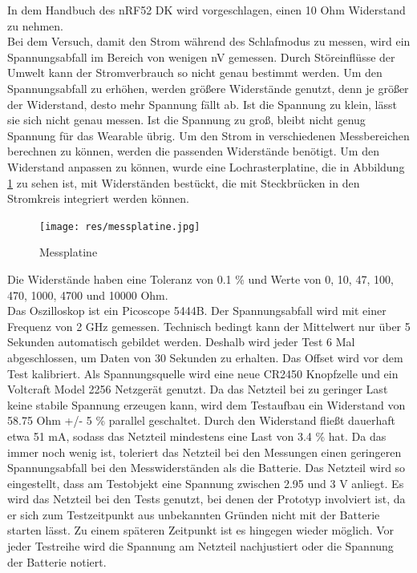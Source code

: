 In dem Handbuch des nRF52 DK wird vorgeschlagen, einen 10 Ohm Widerstand zu nehmen. \cite{site_nrf52dk}\\
Bei dem Versuch, damit den Strom während des Schlafmodus zu messen, wird ein Spannungsabfall im Bereich von wenigen nV gemessen.
Durch Störeinflüsse der Umwelt kann der Stromverbrauch so nicht genau bestimmt werden.
Um den Spannungsabfall zu erhöhen, werden größere Widerstände genutzt, denn je größer der Widerstand, desto mehr Spannung fällt ab.
Ist die Spannung zu klein, lässt sie sich nicht genau messen.
Ist die Spannung zu groß, bleibt nicht genug Spannung für das Wearable übrig.
Um den Strom in verschiedenen Messbereichen berechnen zu können, werden die passenden Widerstände benötigt.
Um den Widerstand anpassen zu können, wurde eine Lochrasterplatine, die in Abbildung \ref{fig:messplatine} zu sehen ist, mit Widerständen bestückt, die mit Steckbrücken in den Stromkreis integriert werden können.
\begin{figure}[hbtp]
	\centering
	\texttt{[image: res/messplatine.jpg]}
	\caption{Messplatine}
	\label{fig:messplatine}
\end{figure}
Die Widerstände haben eine Toleranz von 0.1 \% und Werte von 0, 10, 47, 100, 470, 1000, 4700 und 10000 Ohm.\\
Das Oszilloskop ist ein Picoscope 5444B.
Der Spannungsabfall wird mit einer Frequenz von 2 GHz gemessen.
Technisch bedingt kann der Mittelwert nur über 5 Sekunden automatisch gebildet werden.
Deshalb wird jeder Test 6 Mal abgeschlossen, um Daten von 30 Sekunden zu erhalten.
Das Offset wird vor dem Test kalibriert.
Als Spannungsquelle wird eine neue CR2450 Knopfzelle und ein Voltcraft Model 2256 Netzgerät genutzt.
Da das Netzteil bei zu geringer Last keine stabile Spannung erzeugen kann, wird dem Testaufbau ein Widerstand von 58.75 Ohm +/- 5 \% parallel geschaltet.
Durch den Widerstand fließt dauerhaft etwa 51 mA, sodass das Netzteil mindestens eine Last von 3.4 \% hat.
Da das immer noch wenig ist, toleriert das Netzteil bei den Messungen einen geringeren Spannungsabfall bei den Messwiderständen als die Batterie.
Das Netzteil wird so eingestellt, dass am Testobjekt eine Spannung zwischen 2.95 und 3 V anliegt.
Es wird das Netzteil bei den Tests genutzt, bei denen der Prototyp involviert ist, da er sich zum Testzeitpunkt aus unbekannten Gründen nicht mit der Batterie starten lässt.
Zu einem späteren Zeitpunkt ist es hingegen wieder möglich.
Vor jeder Testreihe wird die Spannung am Netzteil nachjustiert oder die Spannung der Batterie notiert.\\
